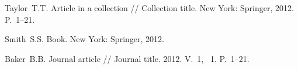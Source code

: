 \begin{references_eng}

  \item %
  Taylor~T.T. Article in a collection // Collection title. New York: Springer, 2012. P.~1--21.

  \item %
  Smith~S.S. Book. New York: Springer, 2012.

  \item
  Baker~B.B. Journal article // Journal title. 2012. V.~1, \No ~1. P.~1--21.


\end{references_eng}

